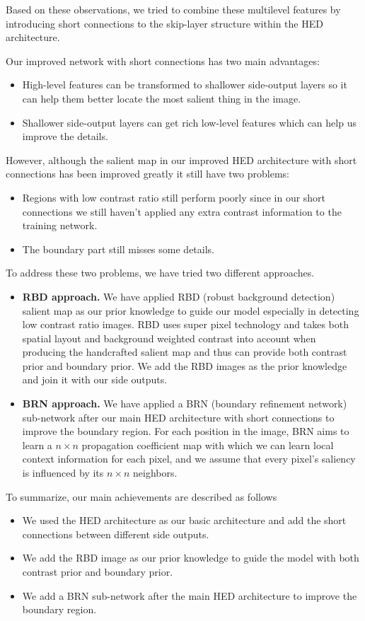 \documentclass[10pt,journal, compsoc]{IEEEtran}
\begin{document}
Based on these observations, we tried to combine these multilevel features by introducing short connections to the skip-layer structure within the HED architecture.

Our improved network with short connections has two main advantages:
\begin{itemize}
	\item High-level features can be transformed to shallower side-output layers so it can help them better locate the most salient thing in the image.
	\item Shallower side-output layers can get rich low-level features which can help us improve the details.
\end{itemize}

However, although the salient map in our improved HED architecture with short connections has been improved greatly it still have two problems:
\begin{itemize}
	\item Regions with low contrast ratio still perform poorly since in our short connections we still haven't applied any extra contrast information to the training network.
	\item The boundary part still misses some details.
\end{itemize}

To address these two problems, we have tried two different approaches. 
\begin{itemize}
	\item \textbf{RBD approach.} We have applied RBD (robust background detection) salient map as our prior knowledge to guide our model especially in detecting low contrast ratio images. RBD uses super pixel technology and takes both spatial layout and background weighted contrast into account when producing the handcrafted salient map and thus can provide both contrast prior and boundary prior. We add the RBD images as the prior knowledge and join it with our side outputs.
	\item \textbf{BRN approach.} We have applied a BRN (boundary refinement network) sub-network after our main HED architecture with short connections to improve the boundary region. For each position in the image, BRN aims to learn a $n\times n$ propagation coefficient map with which we can learn local context information for each pixel, and we assume that every pixel’s saliency is influenced by its $n\times n$ neighbors.
\end{itemize}

To summarize, our main achievements are described as follows
\begin{itemize}
	\item We used the HED architecture as our basic architecture and add the short connections between different side outputs.
	\item We add the RBD image as our prior knowledge to guide the model with both contrast prior and boundary prior.
	\item We add a BRN sub-network after the main HED architecture to improve the boundary region.
\end{itemize}
\end{document}
